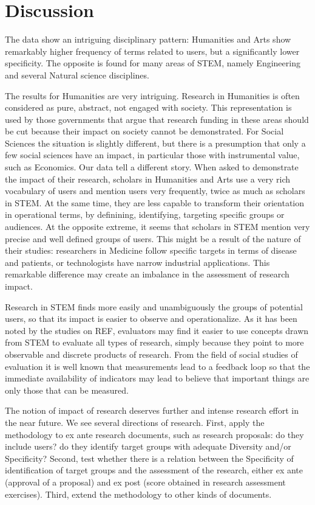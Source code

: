 \documentclass[]{book}
\begin{document}
\section{Discussion}\label{discussion}

The data show an intriguing disciplinary pattern: Humanities and Arts
show remarkably higher frequency of terms related to users, but a
significantly lower specificity. The opposite is found for many areas of
STEM, namely Engineering and several Natural science disciplines.

The results for Humanities are very intriguing. Research in Humanities
is often considered as pure, abstract, not engaged with society. This
representation is used by those governments that argue that research
funding in these areas should be cut because their impact on society
cannot be demonstrated. For Social Sciences the situation is slightly
different, but there is a presumption that only a few social sciences
have an impact, in particular those with instrumental value, such as
Economics. Our data tell a different story. When asked to demonstrate
the impact of their research, scholars in Humanities and Arts use a very
rich vocabulary of users and mention users very frequently, twice as
much as scholars in STEM. At the same time, they are less capable to
transform their orientation in operational terms, by definining,
identifying, targeting specific groups or audiences. At the opposite
extreme, it seems that scholars in STEM mention very precise and well
defined groups of users. This might be a result of the nature of their
studies: researchers in Medicine follow specific targets in terms of
disease and patients, or technologists have narrow industrial
applications. This remarkable difference may create an imbalance in the
assessment of research impact.

Research in STEM finds more easily and unambiguously the groups of
potential users, so that its impact is easier to observe and
operationalize. As it has been noted by the studies on REF, evaluators
may find it easier to use concepts drawn from STEM to evaluate all types
of research, simply because they point to more observable and discrete
products of research. From the field of social studies of evaluation it
is well known that measurements lead to a feedback loop so that the
immediate availability of indicators may lead to believe that important
things are only those that can be measured.

The notion of impact of research deserves further and intense research
effort in the near future. We see several directions of research. First,
apply the methodology to ex ante research documents, such as research
proposals: do they include users? do they identify target groups with
adequate Diversity and/or Specificity? Second, test whether there is a
relation between the Specificity of identification of target groups and
the assessment of the research, either ex ante (approval of a proposal)
and ex post (score obtained in research assessment exercises). Third,
extend the methodology to other kinds of documents.
\end{document}
